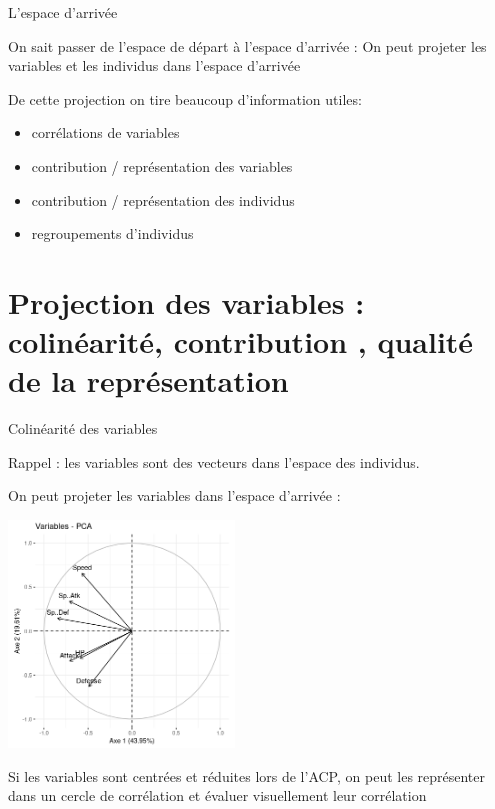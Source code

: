 \documentclass{beamer}
\begin{document}
\begin{frame}{L'espace d'arrivée}

On sait passer de l'espace de départ à l'espace d'arrivée : 
On peut \alert{projeter} les variables et les individus dans l'espace d'arrivée

\medskip

De cette projection on tire beaucoup d'information utiles: 


\begin{itemize}
\item \alert{corrélations} de variables
\item \alert{contribution / représentation}  des variables 
\item \alert{contribution / représentation} des individus 
\item \alert{regroupements} d'individus
\end{itemize}
\end{frame}



\section{Projection des variables : colinéarité, contribution , qualité de la représentation}



\begin{frame}{Colinéarité des variables}

Rappel : les variables sont des vecteurs dans l'espace des individus. 

On peut projeter les variables dans l'espace d'arrivée : 

\begin{center}
\includegraphics[width=0.45\textwidth,keepaspectratio]{img/cercle_trigo_ACP_var.png}
\end{center}
\begin{spacing}{0.7}
\begin{small}
Si les variables sont centrées et réduites lors de l'ACP, on peut les représenter dans un cercle de corrélation et évaluer visuellement leur  corrélation
\end{small}
\end{spacing}

\end{frame}
\end{document}
